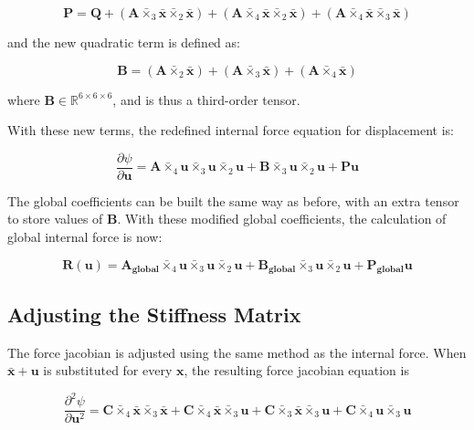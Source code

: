 \documentclass[twocolumn,10pt]{asme2ej}
\begin{document}
\begin{equation}
  \bm{P} = \bm{Q} + (\bm{A} \bar{\times}_3 \bm{\bar{x}} \bar{\times}_2 \bm{\bar{x}})
  + (\bm{A} \bar{\times}_4 \bm{\bar{x}} \bar{\times}_2 \bm{\bar{x}})
  + (\bm{A} \bar{\times}_4 \bm{\bar{x}} \bar{\times}_3 \bm{\bar{x}})
\end{equation}

and the new quadratic term is defined as:

\begin{equation}
  \bm{B} = (\bm{A} \bar{\times}_2 \bm{\bar{x}})
  + (\bm{A}\bar{\times}_3 \bm{\bar{x}})
  + (\bm{A} \bar{\times}_4 \bm{\bar{x}})
\end{equation}

where $\bm{B} \in \mathbb{R}^{6 \times 6 \times 6}$, and is thus a third-order tensor.

With these new terms, the redefined internal force equation for displacement is:

\begin{equation}
 \frac{\partial \psi}{\partial \bm{u}} = \bm{A} \bar{\times}_4 \bm{u} \bar{\times}_3 \bm{u} \bar{\times}_2 \bm{u}
 + \bm{B} \bar{\times}_3 \bm{u} \bar{\times}_2 \bm{u} + \bm{P}\bm{u}
\end{equation}

The global coefficients can be built the same way as before, with an extra tensor to store values of $\bm{B}$. With these modified global coefficients, the calculation of global internal force is now:

\begin{equation}
  \bm{R}(\bm{u}) = \bm{A_{global}} \bar{\times}_4 \bm{u} \bar{\times}_3 \bm{u} \bar{\times}_2 \bm{u}
  + \bm{B_{global}} \bar{\times}_3 \bm{u} \bar{\times}_2 \bm{u} + \bm{P_{global}}\bm{u}
  \label{eq_globalForce}
\end{equation}

\subsection{Adjusting the Stiffness Matrix}

The force jacobian is adjusted using the same method as the internal force. When $\bm{\bar{x}} + \bm{u}$ is substituted for every $\bm{x}$, the resulting force jacobian equation is

\begin{equation}
 \frac{\partial^2 \psi}{\partial \bm{u}^2} = \bm{C} \bar{\times}_4 \bm{\bar{x}} \bar{\times}_3 \bm{\bar{x}}
 + \bm{C} \bar{\times}_4 \bm{\bar{x}} \bar{\times}_3 \bm{u} + \bm{C} \bar{\times}_3 \bm{\bar{x}} \bar{\times}_3 \bm{u}
 + \bm{C} \bar{\times}_4 \bm{u} \bar{\times}_3 \bm{u}
\end{equation}
\end{document}
